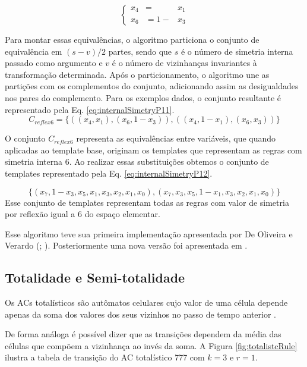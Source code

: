\begin{equation}
\left\{\begin{matrix}
x_4 & = & x_1\\ 
x_6 & = 1 - & x_3
\end{matrix}\right.
\label{eq:internalSimetryP10}
\end{equation}

Para montar essas equivalências, o algoritmo particiona o conjunto de equivalência em $(s-v)/2$ partes, sendo que $s$ é o número de simetria interna passado como argumento e $v$ é o número de vizinhanças invariantes à transformação determinada. Após o particionamento, o algoritmo une as partições com os complementos do conjunto, adicionando assim as desigualdades nos pares do complemento. Para os exemplos dados, o conjunto resultante é representado pela Eq. \eqref{eq:internalSimetryP11}.
\begin{equation}
C_{reflex6}=\{((x_4,x_1),(x_6,1-x_3)),((x_4,1-x_1),(x_6,x_3))\}
\label{eq:internalSimetryP11}
\end{equation}

O conjunto $C_{reflex6}$ representa as equivalências entre variáveis, que quando aplicadas ao template base, originam os templates que representam as regras com simetria interna 6. Ao realizar essas substituições obtemos o conjunto de templates representado pela Eq. \eqref{eq:internalSimetryP12}.

\begin{equation}
\{(x_7,1-x_3,x_5,x_1,x_3,x_2,x_1,x_0),(x_7,x_3,x_5,1-x_1,x_3,x_2,x_1,x_0)\}
\label{eq:internalSimetryP12}
\end{equation}
Esse conjunto de templates representam todas as regras com valor de simetria por reflexão igual a 6 do espaço elementar.

Esse algoritmo teve sua primeira implementação apresentada por De Oliveira e Verardo (\citeyear{deOliveira2014}; \citeyear{deOliveira2014b}). Posteriormente uma nova versão foi apresentada em \cite{Verardo2014}.

\subsection{Totalidade e Semi-totalidade}
Os ACs totalísticos são autômatos celulares cujo valor de uma célula depende apenas da soma dos valores dos seus vizinhos no passo de tempo anterior \cite{wolfram1983statistical}.

De forma análoga é possível dizer que as transições dependem da média das células que compõem  a vizinhança ao invés da soma. A Figura \ref{fig:totalistcRule} ilustra a tabela de transição do AC totalístico 777 com $k = 3$ e $r = 1$. 

